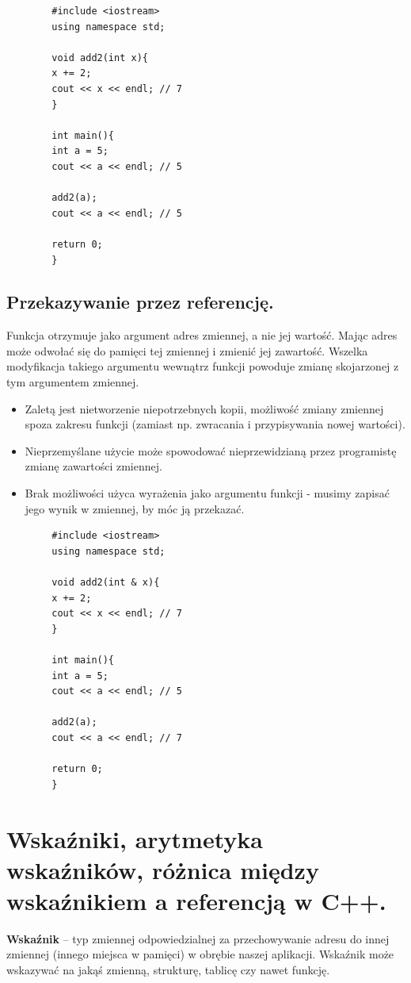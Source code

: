 \documentclass[12pt]{article}
\begin{document}
    \begin{verbatim}
        #include <iostream>
        using namespace std;

        void add2(int x){
        x += 2;
        cout << x << endl; // 7
        }

        int main(){
        int a = 5;
        cout << a << endl; // 5

        add2(a);
        cout << a << endl; // 5

        return 0;
        }
    \end{verbatim}

    \subsection{Przekazywanie przez referencję.}
    Funkcja otrzymuje jako argument adres zmiennej, a nie jej wartość. Mając adres może odwołać się do pamięci tej
    zmiennej i zmienić jej zawartość. Wszelka modyfikacja takiego argumentu wewnątrz funkcji powoduje zmianę skojarzonej
    z tym argumentem zmiennej.
    \begin{itemize}
        \item Zaletą jest nietworzenie niepotrzebnych kopii, możliwość zmiany zmiennej spoza zakresu funkcji (zamiast
        np. zwracania i przypisywania nowej wartości).
        \item Nieprzemyślane użycie może spowodować nieprzewidzianą przez programistę zmianę zawartości zmiennej.
        \item Brak możliwości użyca wyrażenia jako argumentu funkcji - musimy zapisać jego wynik w zmiennej, by móc
        ją przekazać.
    \end{itemize}

    \begin{verbatim}
        #include <iostream>
        using namespace std;

        void add2(int & x){
        x += 2;
        cout << x << endl; // 7
        }

        int main(){
        int a = 5;
        cout << a << endl; // 5

        add2(a);
        cout << a << endl; // 7

        return 0;
        }
    \end{verbatim}

    \newpage

    \section{Wskaźniki, arytmetyka wskaźników, różnica między wskaźnikiem a referencją w C++.}
    \begin{definition}
        \textbf{Wskaźnik} – typ zmiennej odpowiedzialnej za przechowywanie adresu do innej zmiennej (innego miejsca w pamięci) w obrębie naszej aplikacji.
        Wskaźnik może wskazywać na jakąś zmienną, strukturę, tablicę czy nawet funkcję.
    \end{definition}
\end{document}
